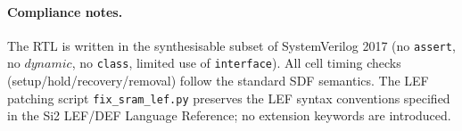 \paragraph{Compliance notes.} The RTL is written in the synthesisable subset of SystemVerilog 2017 (no \texttt{assert}, no \texttt{$dynamic$}, no \texttt{class}, limited use of \texttt{interface}). All cell timing checks (setup/hold/recovery/removal) follow the standard SDF semantics. The LEF patching script \texttt{fix\_sram\_lef.py} preserves the LEF syntax conventions specified in the Si2 LEF/DEF Language Reference; no extension keywords are introduced.
